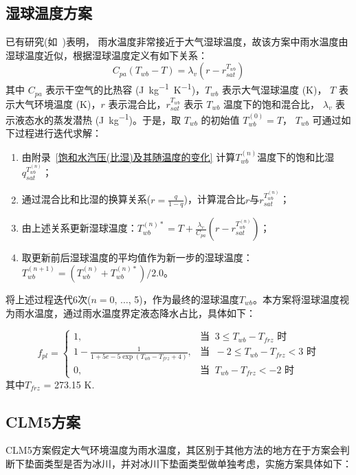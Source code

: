 \subsection{湿球温度方案}\label{湿球温度方案}
已有研究(如~\citet{anderson1998moored})表明，
雨水温度非常接近于大气湿球温度，故该方案中雨水温度由湿球温度近似，根据湿球温度定义有如下关系：
\begin{equation}
\label{eq:湿球温度定义}
C_{p a}\left(T_{w b}-T\right)=\lambda_{v}\left(r-r_{s a t}^{T_{w b}}\right)
\end{equation}
其中 $C_{pa}$ 表示干空气的比热容 (\unit{J.kg^{-1}.K^{-1}})，$T_{wb}$ 表示大气湿球温度 (K)，
$T$ 表示大气环境温度 (K)，$r$ 表示混合比，$r_{sat}^{T_{wb}}$ 表示 $T_{wb}$ 温度下的饱和混合比，
$\lambda_v$ 表示液态水的蒸发潜热 (\unit{J.kg^{-1}})。于是，取 $T_{wb}$ 的初始值 $T_{wb}^{\left(0\right)}=T$，
$T_{wb}$ 可通过如下过程进行迭代求解：
\begin{enumerate}
    \item 由附录~\ref{饱和水汽压(比湿)及其随温度的变化} 计算$T_{wb}^{\left(n\right)}$温度下的饱和比湿$q_{sat}^{T_{wb}^{\left(n\right)}}$；
    \item 通过混合比和比湿的换算关系($r=\frac{q}{1-q}$)，计算混合比$r$与$r_{sat}^{T_{wb}^{\left(n\right)}}$；
    \item 由上述关系更新湿球温度：$T_{wb}^{\left(n\right)\ast}=T+\frac{\lambda_v}{C_{pa}}\left(r-r_{sat}^{T_{wb}^{\left(n\right)}}\right)$；
    \item 取更新前后湿球温度的平均值作为新一步的湿球温度：$T_{wb}^{\left(n+1\right)}=\left(T_{wb}^{\left(n\right)}+T_{wb}^{\left(n\right)\ast}\right)/2.0$。
\end{enumerate}
将上述过程迭代6次($n=0$, $\ldots$, 5)，作为最终的湿球温度$T_{wb}$。本方案将湿球温度视为雨水温度，通过雨水温度界定液态降水占比，具体如下：

\begin{equation}
f_{pl}= \begin{cases}
1, & \text{当 }\ 3\le T_{wb} - T_{frz} \text{ 时} \\
1 - \frac{1}{1 + 5e-5\exp{(T_{wb} - T_{frz}+4)}} , & \text{当 }\ -2\le T_{wb} - T_{frz} < 3 \text{ 时} \\
0, & \text{当 }\ T_{wb} - T_{frz} < -2 \text{ 时}
\end{cases}
\end{equation}
%
其中$T_{frz}$ = 273.15 K.


\subsection{CLM5方案}
CLM5方案假定大气环境温度为雨水温度，其区别于其他方法的地方在于方案会判断下垫面类型是否为冰川，并对冰川下垫面类型做单独考虑，实施方案具体如下：

